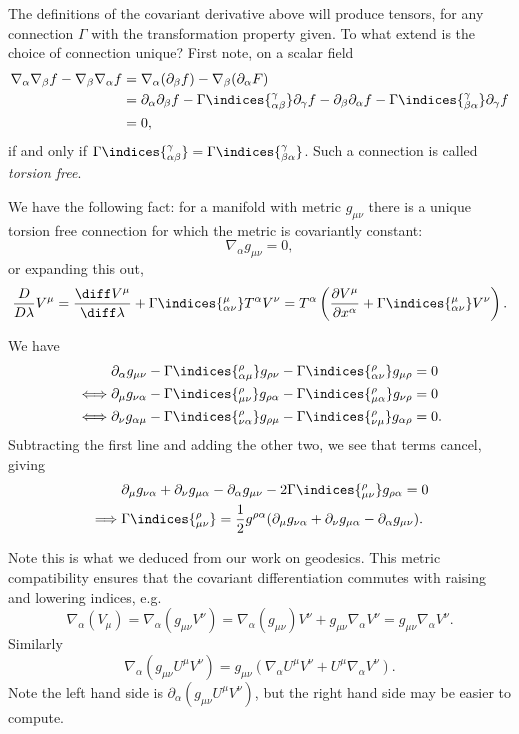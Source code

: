 \documentclass[12pt]{article}
\begin{document}
The definitions of the covariant derivative above will produce tensors, for any connection $\Gamma$ with the transformation property given. To what extend is the choice of connection unique? First note, on a scalar field
\begin{align*}
	\nabla_\alpha \nabla_\beta f - \nabla_\beta \nabla_\alpha f &= \nabla_\alpha(\partial_\beta f) - \nabla_\beta(\partial_\alpha F) \\
								&= \partial_\alpha \partial_\beta f - \Gamma\indices{^{\gamma}_{\alpha\beta}} \partial_\gamma f - \partial_\beta \partial_\alpha f - \Gamma\indices{^{\gamma}_{\beta\alpha}} \partial_\gamma f \\
								&= 0,
\end{align*}
if and only if $\Gamma\indices{^{\gamma}_{\alpha\beta}} = \Gamma\indices{^{\gamma}_{\beta\alpha}}$. Such a connection is called \emph{torsion free}.

We have the following fact: for a manifold with metric $g_{\mu\nu}$ there is a unique torsion free connection for which the metric is covariantly constant:
\[
\nabla_\alpha g_{\mu\nu} = 0,
\]
or expanding this out,
\[
	\frac{D}{D \lambda} V^\mu = \frac{\diff V^\mu}{\diff \lambda} + \Gamma\indices{^\mu_{\alpha\nu}} T^\alpha V^\nu = T^\alpha \left( \frac{\partial V^\mu}{\partial x^\alpha} + \Gamma\indices{^\mu_{\alpha\nu}} V^\nu \right).
\]
\begin{proofbox}
	We have
	\begin{align*}
		& \partial_\alpha g_{\mu\nu} - \Gamma\indices{^\rho_{\alpha\mu}}g_{\rho\nu} - \Gamma\indices{^\rho_{\alpha\nu}} g_{\mu\rho} = 0\\
		\iff & \partial_\mu g_{\nu\alpha} - \Gamma\indices{^\rho_{\mu\nu}}g_{\rho\alpha} - \Gamma\indices{^\rho_{\mu\alpha}}g_{\nu\rho} = 0 \\
	\iff & \partial_\nu g_{\alpha\mu} - \Gamma\indices{^\rho_{\nu\alpha}} g_{\rho\mu} - \Gamma\indices{^\rho_{\nu\mu}}g_{\alpha\rho} = 0.
	\end{align*}
	Subtracting the first line and adding the other two, we see that terms cancel, giving
	\begin{align*}
		& \partial_\mu g_{\nu\alpha} + \partial_\nu g_{\mu\alpha} - \partial_\alpha g_{\mu\nu} - 2 \Gamma \indices{^\rho_{\mu\nu}}g_{\rho\alpha} = 0 \\
		\implies & \Gamma\indices{^\rho_{\mu\nu}} = \frac{1}{2} g^{\rho\alpha} (\partial_\mu g_{\nu\alpha} + \partial_\nu g_{\mu\alpha} - \partial_\alpha g_{\mu\nu}).
	\end{align*}
\end{proofbox}
Note this is what we deduced from our work on geodesics. This metric compatibility ensures that the covariant differentiation commutes with raising and lowering indices, e.g.
\[
\nabla_\alpha (V_\mu) = \nabla_\alpha (g_{\mu\nu} V^\nu) = \nabla_\alpha (g_{\mu\nu}) V^\nu + g_{\mu\nu} \nabla_\alpha V^\nu = g_{\mu\nu} \nabla_\alpha V^\nu.
\]
Similarly
\[
	\nabla_\alpha (g_{\mu\nu} U^\mu V^\nu) = g_{\mu\nu} (\nabla_\alpha U^\mu V^\nu + U^\mu \nabla_\alpha V^\nu).
\]
Note the left hand side is $\partial_\alpha (g_{\mu\nu} U^\mu V^\nu)$, but the right hand side may be easier to compute.
\end{document}
